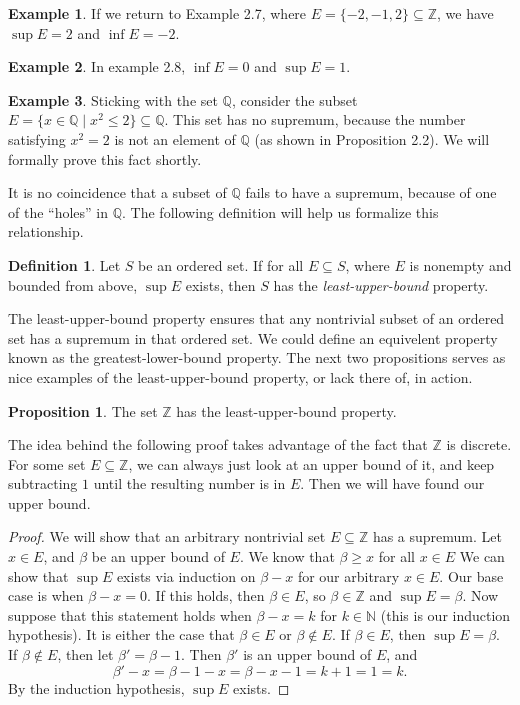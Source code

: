 \documentclass{article}
\newcommand{\N}{\mathbb{N}}
\newcommand{\Q}{\mathbb{Q}}
\newcommand{\Z}{\mathbb{Z}}
\theoremstyle{definition}
\newtheorem{proposition}{Proposition}[section]
\newtheorem{definition}{Definition}[section]
\newtheorem{example}{Example}[section]
\begin{document}
	\begin{example}
		If we return to Example 2.7, where $ E=\{-2,-1,2\}\subseteq\Z $, we have $ \sup E=2 $ and $ \inf E=-2 $. 
	\end{example}
	\begin{example}
		In example 2.8, $ \inf E=0 $ and $ \sup E=1 $.
	\end{example}
	\begin{example}
		Sticking with the set $ \Q$, consider the subset $ E=\{x\in\Q\mid x^2\le 2\}\subseteq \Q $. This set has no supremum, because the number satisfying $ x^2=2 $ is not an element of $ \Q $ (as shown in Proposition 2.2). We will formally prove this fact shortly. 
	\end{example}
	It is no coincidence that a subset of $ \Q $ fails to have a supremum, because of one of the ``holes'' in $ \Q $. The following definition will help us formalize this relationship. 
	\begin{definition}
		Let $ S $ be an ordered set. If for all $ E\subseteq S $, where $ E $ is nonempty and bounded from above, $ \sup E $ exists, then $ S $ has the \textit{\color{red}least-upper-bound} property. 
	\end{definition}
	The least-upper-bound property ensures that any nontrivial subset of an ordered set has a supremum in that ordered set. We could define an equivelent property known as the greatest-lower-bound property. The next two propositions serves as nice examples of the least-upper-bound property, or lack there of,  in action.
	\begin{proposition}
		The set $ \Z $ has the least-upper-bound property.
	\end{proposition}
	The idea behind the following proof takes advantage of the fact that $ \Z $ is discrete. For some set $ E\subseteq \Z $, we can always just look at an upper bound of it, and keep subtracting $ 1 $ until the resulting number is in $ E $. Then we will have found our upper bound.
	\begin{proof}
		We will show that an arbitrary nontrivial set $ E\subseteq \Z $ has a supremum. Let $ x\in E $, and $ \beta $ be an upper bound of $ E $. We know that $ \beta\ge x $ for all $ x\in E $ We can show that $ \sup E $ exists via induction on $ \beta-x $ for our arbitrary $ x\in E $. Our base case is when $ \beta-x=0 $. If this holds, then $ \beta\in E $, so $ \beta\in\Z $ and $ \sup E=\beta $. Now suppose that this statement holds when $ \beta-x=k $ for $ k\in\N $ (this is our induction hypothesis). It is either the case that $ \beta\in E $ or $ \beta\notin E $. If $ \beta\in E $, then $ \sup E=\beta $. If $ \beta \notin E $, then let $ \beta'=\beta -1 $. Then $ \beta' $ is an upper bound of $ E $, and $$\beta'-x=\beta-1-x=\beta-x-1=k+1=1=k .$$ By the induction hypothesis, $ \sup E $ exists.   
	\end{proof}
\end{document}

